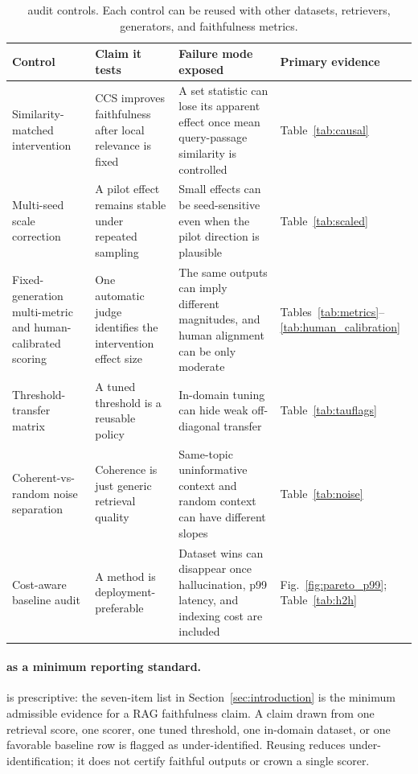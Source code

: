 \begingroup
\renewcommand{\arraystretch}{1.15}
\begin{table}[H]
\centering
\footnotesize
\caption{\method{} audit controls. Each control can be reused with other
datasets, retrievers, generators, and faithfulness metrics.}
\label{tab:controlledrag_protocol}
\begin{tabular}{p{2.6cm}p{3.6cm}p{4.4cm}p{1.8cm}}
\toprule
Control & Claim it tests & Failure mode exposed & Primary evidence \\
\midrule
Similarity-matched intervention &
CCS improves faithfulness after local relevance is fixed &
A set statistic can lose its apparent effect once mean query-passage similarity is controlled &
Table~\ref{tab:causal} \\
Multi-seed scale correction &
A pilot effect remains stable under repeated sampling &
Small effects can be seed-sensitive even when the pilot direction is plausible &
Table~\ref{tab:scaled} \\
Fixed-generation multi-metric and human-calibrated scoring &
One automatic judge identifies the intervention effect size &
The same outputs can imply different magnitudes, and human alignment can be only moderate &
Tables~\ref{tab:metrics}--\ref{tab:human_calibration} \\
Threshold-transfer matrix &
A tuned threshold is a reusable policy &
In-domain tuning can hide weak off-diagonal transfer &
Table~\ref{tab:tauflags} \\
Coherent-vs-random noise separation &
Coherence is just generic retrieval quality &
Same-topic uninformative context and random context can have different slopes &
Table~\ref{tab:noise} \\
Cost-aware baseline audit &
A method is deployment-preferable &
Dataset wins can disappear once hallucination, p99 latency, and indexing cost are included &
Fig.~\ref{fig:pareto_p99}; Table~\ref{tab:h2h} \\
\bottomrule
\end{tabular}
\end{table}
\endgroup

\paragraph{\method{} as a minimum reporting standard.}
\label{sec:controlledrag_standard}
\method{} is prescriptive: the seven-item list in
Section~\ref{sec:introduction} is the minimum admissible evidence for a RAG
faithfulness claim. A claim drawn from one retrieval score, one scorer, one
tuned threshold, one in-domain dataset, or one favorable baseline row is
flagged as under-identified. Reusing \method{} reduces under-identification;
it does not certify faithful outputs or crown a single scorer.
